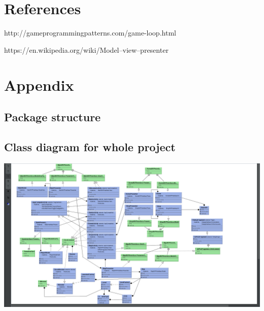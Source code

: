 \documentclass{article}
\begin{document}
\section{References}
\begin{thebibliography}{9}
    
        http://gameprogrammingpatterns.com/game-loop.html
    
        https://en.wikipedia.org/wiki/Model–view–presenter

\end{thebibliography}

\section{Appendix}
\subsection{Package structure}
\begin{center}
\end{center}

\subsection{Class diagram for whole project}
\includegraphics[scale=0.4]{uml/ClassDiagram.png}
\end{document}
